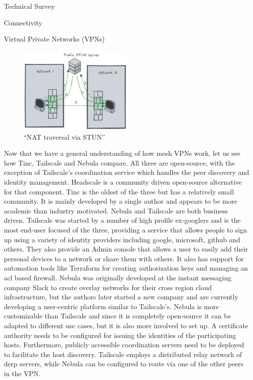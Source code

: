 \begin{frame}{Technical Survey}
\begin{block}{Connectivity}
\begin{block}{Virtual Private Networks (VPNs)}
\begin{figure}
\centering
\includegraphics[width=0.5\textwidth,height=0.25\textheight]{prep/../figures/nat-traversal.png}
\caption{``NAT traversal via STUN''\label{nat-traversal}}
\end{figure}

Now that we have a general understanding of how mesh VPNs work, let us
see how Tinc, Tailscale and Nebula compare. All three are open-source,
with the exception of Tailscale's coordination service which handles the
peer discovery and identity management. Headscale
\autocite{fontJuanfontHeadscale2022} is a community driven open-source
alternative for that component. Tinc is the oldest of the three but has
a relatively small community. It is mainly developed by a single author
and appears to be more academic than industry motivated. Nebula and
Tailscale are both business driven. Tailscale was started by a number of
high profile ex-googlers and is the most end-user focused of the three,
providing a service that allows people to sign up using a variety of
identity providers including google, microsoft, github and others. They
also provide an Admin console that allows a user to easily add their
personal devices to a network or share them with others. It also has
support for automation tools like Terraform for creating authorization
keys and managing an \gls{acl} based firewall. Nebula was originally
developed at the instant messaging company Slack to create overlay
networks for their cross region cloud infrastructure, but the authors
later started a new company and are currently developing a user-centric
platform similar to Tailscale's. Nebula is more customizable than
Tailscale and since it is completely open-source it can be adapted to
different use cases, but it is also more involved to set up. A
certificate authority needs to be configured for issuing the identities
of the participating hosts. Furthermore, publicly accessible
coordination servers need to be deployed to facilitate the host
discovery. Tailscale employs a distributed relay network of \gls{derp}
servers, while Nebula can be configured to route via one of the other
peers in the VPN.


\end{block}
\end{block}
\end{frame}
